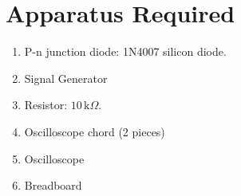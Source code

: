 \section{Apparatus Required}

\begin{enumerate}
  \setlength{\itemsep}{0pt}
        \setlength{\parskip}{0pt}
        \setlength{\parsep}{0pt}
  \item P-n junction diode: 1N4007 silicon diode.
  \item Signal Generator
  \item Resistor: $10\,\text{k}\Omega$.
  \item Oscilloscope chord (2 pieces)
  \item Oscilloscope
  \item Breadboard
\end{enumerate}
